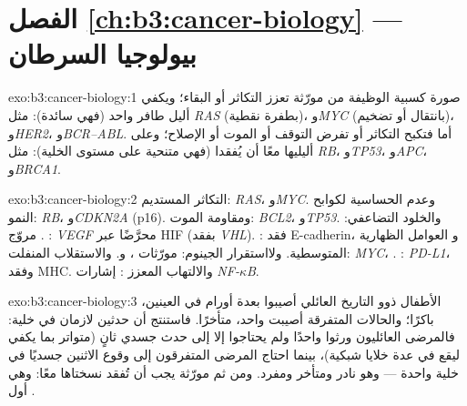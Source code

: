 \section*{الفصل \ref{ch:b3:cancer-biology} --- بيولوجيا السرطان}

\begin{solution}{exo:b3:cancer-biology:1}
 صورة كسبية الوظيفة من مورّثة تعزز
التكاثر أو البقاء؛ ويكفي أليل طافر واحد (فهي سائدة):
مثل \emph{RAS} (بطفرة نقطية)، و\emph{MYC} (بانتقال أو تضخيم)،
و\emph{HER2}، و\emph{BCR--ABL}. أما  فتكبح
التكاثر أو تفرض التوقف أو الموت أو الإصلاح؛ وعلى أليليها معًا أن
يُفقدا (فهي متنحية على مستوى الخلية): مثل \emph{RB}، و\emph{TP53}، و\emph{APC}،
و\emph{BRCA1}.
\end{solution}

\begin{solution}{exo:b3:cancer-biology:2}
التكاثر المستديم: \emph{RAS}، و\emph{MYC}. وعدم الحساسية
لكوابح النمو: \emph{RB}، و\emph{CDKN2A} (p16). ومقاومة الموت:
\emph{BCL2}، و\emph{TP53}. والخلود التضاعفي: مروّج
. : \emph{VEGF} محرَّضًا عبر HIF (بفقد
\emph{VHL}).  : فقد E-cadherin، و
العوامل الظهارية المتوسطية. ولااستقرار الجينوم: مورّثات ،
و\emph{}. والاستقلاب المنفلت: \emph{MYC}، .
: \emph{PD-L1}، وفقد MHC. والالتهاب المعزز :
إشارات \emph{NF-$\kappa$B}.
\end{solution}

\begin{solution}{exo:b3:cancer-biology:3}
الأطفال ذوو التاريخ العائلي أصيبوا بعدة أورام في العينين،
باكرًا؛ والحالات المتفرقة أصيبت  واحد، متأخرًا. فاستنتج أن
حدثين لازمان في خلية: فالمرضى العائليون ورثوا
واحدًا ولم يحتاجوا إلا إلى حدث جسدي ثانٍ (متواتر بما يكفي ليقع
في عدة خلايا شبكية)، بينما احتاج المرضى المتفرقون إلى وقوع الاثنين
جسديًا في خلية واحدة --- وهو نادر ومتأخر ومفرد. ومن ثم مورّثة يجب أن تُفقد
نسختاها معًا: وهي أول .
\end{solution}

